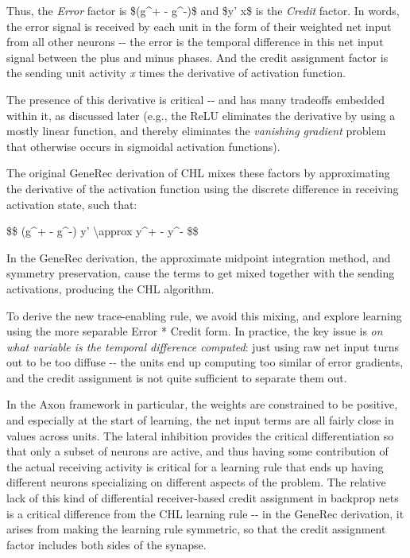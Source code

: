\documentclass[11pt,twoside]{article}
\newif\myifpdf
\begin{document}
Thus, the \emph{Error} factor is \$(g\^{}+ - g\^{}-)\$ and \$y' x\$ is
the \emph{Credit} factor. In words, the error signal is received by each
unit in the form of their weighted net input from all other neurons -\/-
the error is the temporal difference in this net input signal between
the plus and minus phases. And the credit assignment factor is the
sending unit activity \emph{x} times the derivative of activation
function.

The presence of this derivative is critical -\/- and has many tradeoffs
embedded within it, as discussed later (e.g., the ReLU eliminates the
derivative by using a mostly linear function, and thereby eliminates the
\emph{vanishing gradient} problem that otherwise occurs in sigmoidal
activation functions).

The original GeneRec derivation of CHL mixes these factors by
approximating the derivative of the activation function using the
discrete difference in receiving activation state, such that:

\$\$ (g\^{}+ - g\^{}-) y' \textbackslash approx y\^{}+ - y\^{}- \$\$

In the GeneRec derivation, the approximate midpoint integration method,
and symmetry preservation, cause the terms to get mixed together with
the sending activations, producing the CHL algorithm.

To derive the new trace-enabling rule, we avoid this mixing, and explore
learning using the more separable Error * Credit form. In practice, the
key issue is \emph{on what variable is the temporal difference
computed}: just using raw net input turns out to be too diffuse -\/- the
units end up computing too similar of error gradients, and the credit
assignment is not quite sufficient to separate them out.

In the Axon framework in particular, the weights are constrained to be
positive, and especially at the start of learning, the net input terms
are all fairly close in values across units. The lateral inhibition
provides the critical differentiation so that only a subset of neurons
are active, and thus having some contribution of the actual receiving
activity is critical for a learning rule that ends up having different
neurons specializing on different aspects of the problem. The relative
lack of this kind of differential receiver-based credit assignment in
backprop nets is a critical difference from the CHL learning rule -\/-
in the GeneRec derivation, it arises from making the learning rule
symmetric, so that the credit assignment factor includes both sides of
the synapse.
\end{document}
